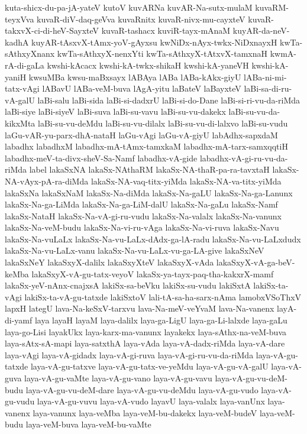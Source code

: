 {kuta-shicx-du-pa-jA-yateV
kutoV
kuvARNa
kuvAR-Na-sutx-mulaM
kuvaRM-teyxVva
kuvaR-diV-daq-geVva
kuvaRnitx
kuvaR-nivx-mu-cayxteV
kuvaR-takxvX-ci-di-heV-SayxteV
kuvaR-tashacx
kuviR-tayx-mAnaM
kuyAR-da-neV-kadhA
kuyAR-tAsxvX-tAmx-yoV-gAyxsu
kwNiDx-nAyx-twkx-NiDxnayxH
kwTa-sAthxyXnanx
kwTa-sAthxyX-nenxYti
kwTa-sAthxyX-tAtxvX-tamxnaH
kwmA-rA-di-gaLa
kwshi-kAcacx
kwshi-kA-twkx-shikaH
kwshi-kA-yaneVH
kwshi-kA-yaniH
kwsuMBa
kwsu-maBxsayx
lABAya
lABa
lABa-kAkx-giyU
lABa-ni-mi-tatx-vAgi
lABavU
lABa-veM-buva
lAgA-yitu
laBateV
laBayxteV
laBi-sa-di-ru-vA-galU
laBi-salu
laBi-sida
laBi-si-dadxrU
laBi-si-do-Dane
laBi-si-ri-vu-da-riMda
laBi-siye
laBi-siyeV
laBi-suva
laBi-su-vavu
laBi-su-vu-dakekx
laBi-su-vu-da-kikxMta
laBi-su-vu-deMdu
laBi-su-vu-dilalx
laBi-su-vu-di-lalxvo
laBi-su-vudu
laGu-vAR-yu-parx-dhA-nataH
laGu-vAgi
laGu-vA-giyU
labAdhx-sapxdaM
labadhx
labadhxM
labadhx-mA-tAmx-tamxkaM
labadhx-mA-tarx-samxqqtiH
labadhx-meV-ta-divx-sheV-Sa-Namf
labadhx-vA-gide
labadhx-vA-gi-ru-vu-da-riMda
label
lakaSxNA
lakaSx-NAthaRM
lakaSx-NA-thaR-pa-ra-tavxtaH
lakaSx-NA-vAyx-pA-ra-diMda
lakaSx-NA-vaq-titx-yiMda
lakaSx-NA-va-titx-yiMda
lakaSxNa
lakaSxNaM
lakaSx-Na-diMda
lakaSx-Na-gaLU
lakaSx-Na-ga-Lanunx
lakaSx-Na-ga-LiMda
lakaSx-Na-ga-LiM-dalU
lakaSx-Na-gaLu
lakaSx-Namf
lakaSx-NataH
lakaSx-Na-vA-gi-ru-vudu
lakaSx-Na-valalx
lakaSx-Na-vanunx
lakaSx-Na-veM-budu
lakaSx-Na-vi-ru-vAga
lakaSx-Na-vi-ruva
lakaSx-Navu
lakaSx-Na-vuLaLx
lakaSx-Na-vu-LaLx-dAdx-ga-lA-radu
lakaSx-Na-vu-LaLxdudx
lakaSx-Na-vu-LaLx-vanu
lakaSx-Na-vu-LaLx-vu-ga-LA-give
lakaSxNeV
lakaSxNeY
lakaSxyX-dalilx
lakaSxyXteV
lakaSxyX-vAda
lakaSxyX-vA-ga-beV-keMba
lakaSxyX-vA-gu-tatx-veyoV
lakaSx-ya-tayx-paq-tha-kakxrX-mamf
lakaSx-yeV-nAnx-cnajxsA
lakiSx-sa-beVku
lakiSx-su-vudu
lakiSxtA
lakiSx-ta-vAgi
lakiSx-ta-vA-gu-tatxde
lakiSxtoV
lali-tA-sa-ha-sarx-nAma
lamobxVSoThxV
lapxH
lategU
lava-Na-keSxV-tarxvu
lava-Na-meV-veYvaM
lava-Na-vanenx
layA-di-yamf
laya
layaH
layaM
laya-dalilx
laya-ga-LigU
laya-ga-Li-lalxde
laya-gaLu
laya-go-Lisi
layakUkx
laya-karx-ma-vanunx
layakekx
laya-sAthx-na-veM-buva
laya-sAtx-sA-mapi
laya-satxthA
laya-vAda
laya-vA-dadx-riMda
laya-vA-dare
laya-vAgi
laya-vA-gidadx
laya-vA-gi-ruva
laya-vA-gi-ru-vu-da-riMda
laya-vA-gu-tatxde
laya-vA-gu-tatxve
laya-vA-gu-tatx-ve-yeMdu
laya-vA-gu-vA-galU
laya-vA-guva
laya-vA-gu-vaMte
laya-vA-gu-vano
laya-vA-gu-vavu
laya-vA-gu-vu-deM-budu
laya-vA-gu-vu-deM-dare
laya-vA-gu-vu-deMdu
laya-vA-gu-vudo
laya-vA-gu-vudu
laya-vA-gu-vuvu
laya-vA-vudo
layavU
laya-valalx
laya-vanUnx
laya-vanenx
laya-vanunx
laya-veMba
laya-veM-bu-dakekx
laya-veM-budeV
laya-veM-budu
laya-veM-buva
laya-veM-bu-vaMte
}
